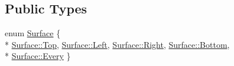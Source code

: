 \subsection*{Public Types}
\begin{DoxyCompactItemize}
\item 
enum \hyperlink{classZeta_1_1Rectangle_a04ae0d4d037f13e313b042bff55c5f62}{Surface} \{ \\*
\hyperlink{classZeta_1_1Rectangle_a04ae0d4d037f13e313b042bff55c5f62aa4ffdcf0dc1f31b9acaf295d75b51d00}{Surface\+::\+Top}, 
\hyperlink{classZeta_1_1Rectangle_a04ae0d4d037f13e313b042bff55c5f62a945d5e233cf7d6240f6b783b36a374ff}{Surface\+::\+Left}, 
\hyperlink{classZeta_1_1Rectangle_a04ae0d4d037f13e313b042bff55c5f62a92b09c7c48c520c3c55e497875da437c}{Surface\+::\+Right}, 
\hyperlink{classZeta_1_1Rectangle_a04ae0d4d037f13e313b042bff55c5f62a2ad9d63b69c4a10a5cc9cad923133bc4}{Surface\+::\+Bottom}, 
\\*
\hyperlink{classZeta_1_1Rectangle_a04ae0d4d037f13e313b042bff55c5f62affcf70e892b8ac3facbac0f88602396b}{Surface\+::\+Every}
 \}
\end{DoxyCompactItemize}
